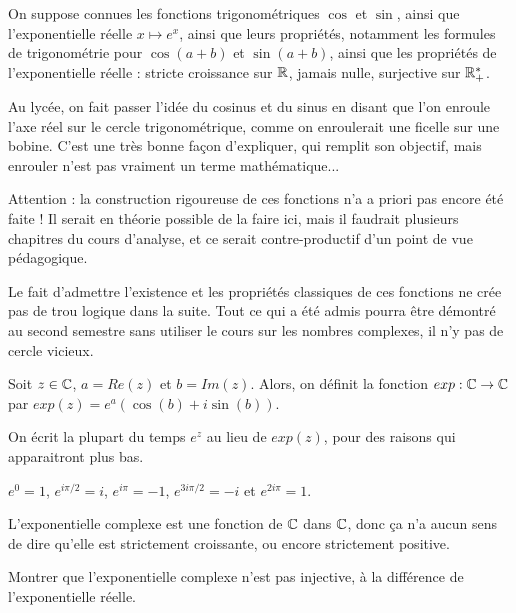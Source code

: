 On suppose connues les fonctions trigonométriques $\cos$ et $\sin$, ainsi que l'exponentielle réelle $x\mapsto e^x$, ainsi que leurs propriétés, notamment les formules de trigonométrie pour $\cos(a+b)$ et $\sin(a+b)$, ainsi que les propriétés de l'exponentielle réelle : stricte croissance sur $\mathbb{R}$, jamais nulle, surjective sur $\mathbb{R}_+^*$.

\begin{remarque}
Au lycée, on fait passer l'idée du cosinus et du sinus en disant que l'on \og enroule l'axe réel sur le cercle trigonométrique\fg, comme on enroulerait une ficelle sur une bobine. C'est une très bonne façon d'expliquer, qui remplit son objectif, mais \og enrouler\fg{} n'est pas vraiment un terme mathématique...
\end{remarque}

\begin{mdframed}
Attention : la construction rigoureuse de ces fonctions n'a a priori pas encore été faite ! Il serait en théorie possible de la faire ici, mais il faudrait plusieurs chapitres du cours d'analyse, et ce serait contre-productif d'un point de vue pédagogique.

Le fait d'admettre l'existence et les propriétés classiques de ces fonctions ne crée pas de trou logique dans la suite. Tout ce qui a été admis pourra être démontré au second semestre sans utiliser le cours sur les nombres complexes, il n'y pas de cercle vicieux.
\end{mdframed}



\begin{definition}
Soit $z \in \mathbb{C}$, $a = Re(z)$ et $b = Im(z)$. Alors, on définit la fonction $exp : \mathbb{C}\to \mathbb{C}$ par $exp(z) = e^a (\cos(b)+i \sin(b))$.

On écrit la plupart du temps $e^z$ au lieu de $exp(z)$, pour des raisons qui apparaitront plus bas.
\end{definition}


\begin{exemples}
$e^0=1$, $e^{i\pi/2} = i$, $e^{i\pi}=-1$, $e^{3i\pi/2}=-i$ et $e^{2i\pi}=1$. 
\end{exemples}

\begin{attention}
L'exponentielle complexe est une fonction de $\mathbb{C}$ dans $\mathbb{C}$, donc ça n'a aucun sens de dire qu'elle est \og strictement croissante\fg, ou encore \og strictement positive\fg. 
\end{attention}
\begin{exo}
Montrer que l'exponentielle complexe n'est pas injective, à la différence de l'exponentielle réelle.
\end{exo}


